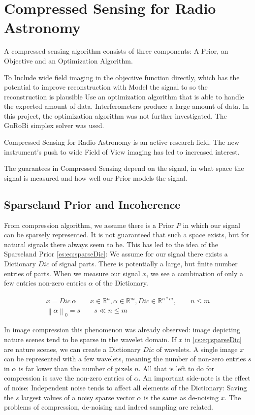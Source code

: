 \section{Compressed Sensing for Radio Astronomy} \label{cs}
A compressed sensing algorithm consists of three components: A Prior, an Objective and an Optimization Algorithm. 

To Include wide field imaging in the objective function directly, which has the potential to improve reconstruction with 
Model the signal to so the reconstruction is plausible
Use an optimization algorithm that is able to handle the expected amount of data. Interferometers produce a large amount of data. In this project, the optimization algorithm was not further investigated. The GuRoBi simplex solver was used.

Compressed Sensing for Radio Astronomy is an active research field. The new instrument's push to wide Field of View imaging has led to increased interest. 

The guarantees in Compressed Sensing depend on the signal, in what space the signal is measured and how well our Prior models the signal. 


\subsection{Sparseland Prior and Incoherence}
From compression algorithm, we assume there is a Prior $P$ in which our signal can be sparsely represented. It is not guaranteed that such a space exists, but for natural signals there always seem to be. This has led to the idea of the Sparseland Prior \eqref{cs:eq:sparseDic}: We assume for our signal there exists a Dictionary $Dic$ of signal parts. There is potentially a large, but finite number entries of parts. When we measure our signal $x$, we see a combination of only a few entries non-zero entries $\alpha$ of the Dictionary. 

\begin{equation} \label{cs:eq:sparseDic}
	\begin{split}
		x = Dic \: \alpha  \qquad  x \in \mathbb{R}^{n}, \alpha \in \mathbb{R}^{m}, Dic \in \mathbb{R}^{n*m}, \qquad n \leq m \\
		\left \| \alpha \right \|_0 = s \qquad s \ll n \leq m
	\end{split}
\end{equation}

In image compression this phenomenon was already observed: image depicting nature scenes tend to be sparse in the wavelet domain. If $x$ in \eqref{cs:eq:sparseDic} are nature scenes, we can create a Dictionary $Dic$ of wavelets. A single image $x$ can be represented with a few wavelets, meaning the number of non-zero entries $s$ in $\alpha$ is far lower than the number of pixels $n$. All that is left to do for compression is save the non-zero entries of $\alpha$.  An important side-note is the effect of noise: Independent noise tends to affect all elements of the Dictionary: Saving the $s$ largest values of a noisy sparse vector $\alpha$ is the same as de-noising $x$. The problems of compression, de-noising and indeed sampling are related.

